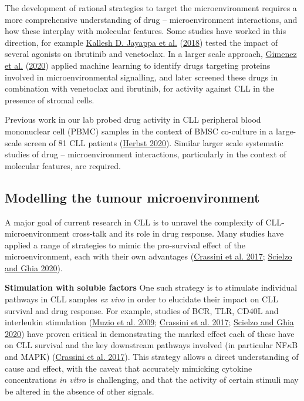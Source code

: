 \documentclass[11pt, a4paper, twosided]{book}
\begin{document}
The development of rational strategies to target the microenvironment requires a more comprehensive understanding of drug -- microenvironment interactions, and how these interplay with molecular features. Some studies have worked in this direction, for example \protect\hyperlink{ref-Jayappa2018}{Kallesh D. Jayappa et al.} (\protect\hyperlink{ref-Jayappa2018}{2018}) tested the impact of several agonists on ibrutinib and venetoclax. In a larger scale approach, \protect\hyperlink{ref-Gimenez2020}{Gimenez et al.} (\protect\hyperlink{ref-Gimenez2020}{2020}) applied machine learning to identify drugs targeting proteins involved in microenvironmental signalling, and later screened these drugs in combination with venetoclax and ibrutinib, for activity against CLL in the presence of stromal cells.

Previous work in our lab probed drug activity in CLL peripheral blood mononuclear cell (PBMC) samples in the context of BMSC co-culture in a large-scale screen of 81 CLL patients (\protect\hyperlink{ref-HerbstThesis}{Herbst 2020}). Similar larger scale systematic studies of drug -- microenvironment interactions, particularly in the context of molecular features, are required.

\hypertarget{modelling-microenvironment-intro}{%
\subsection{Modelling the tumour microenvironment}\label{modelling-microenvironment-intro}}

A major goal of current research in CLL is to unravel the complexity of CLL-microenvironment cross-talk and its role in drug response. Many studies have applied a range of strategies to mimic the pro-survival effect of the microenvironment, each with their own advantages (\protect\hyperlink{ref-Crassini2017}{Crassini et al. 2017}; \protect\hyperlink{ref-Scielzo2020}{Scielzo and Ghia 2020}).

\textbf{Stimulation with soluble factors}
One such strategy is to stimulate individual pathways in CLL samples \emph{ex vivo} in order to elucidate their impact on CLL survival and drug response. For example, studies of BCR, TLR, CD40L and interleukin stimulation (\protect\hyperlink{ref-Muzio2009}{Muzio et al. 2009}; \protect\hyperlink{ref-Crassini2017}{Crassini et al. 2017}; \protect\hyperlink{ref-Scielzo2020}{Scielzo and Ghia 2020}) have proven critical in demonstrating the marked effect each of these have on CLL survival and the key downstream pathways involved (in particular NF\(\kappa\)B and MAPK) (\protect\hyperlink{ref-Crassini2017}{Crassini et al. 2017}). This strategy allows a direct understanding of cause and effect, with the caveat that accurately mimicking cytokine concentrations \emph{in vitro} is challenging, and that the activity of certain stimuli may be altered in the absence of other signals.
\end{document}
